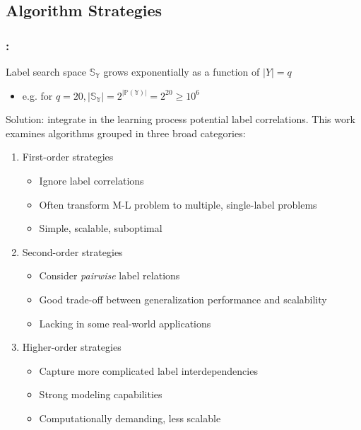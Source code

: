 \documentclass{beamer}
\begin{document}
\subsection{Algorithm Strategies}
\begin{frame}
\frametitle{\insertsection : \insertsubsection}
Label search space $\mathbb{S_Y}$ grows exponentially as a function of $|Y|=q$
\begin{itemize}
\item e.g. for $q=20, |\mathbb{S_Y}| = 2 ^ {|\mathbb{P(Y)}|} = 2^{20} \ge 10^6$
\end{itemize}
Solution: integrate in the learning process potential label correlations.
This work examines algorithms grouped in three broad categories:

\begin{enumerate}
\item First-order strategies
\begin{itemize}
\item Ignore label correlations
\item Often transform M-L problem to multiple, single-label problems
\item Simple, scalable, suboptimal
\end{itemize}
\item Second-order strategies
\begin{itemize}
\item Consider \emph{pairwise} label relations
\item Good trade-off between generalization performance and scalability
\item Lacking in some real-world applications
\end{itemize}
\item Higher-order strategies
\begin{itemize}
\item Capture more complicated label interdependencies
\item Strong modeling capabilities
\item Computationally demanding, less scalable
\end{itemize}

\end{enumerate}
\end{frame}

\end{document}
